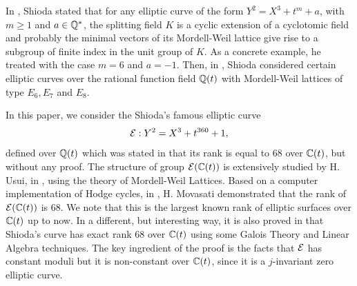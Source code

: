 \documentclass[11pt]{amsart}
\begin{document}

In \cite{Shioda1999a}, Shioda stated that for any elliptic curve of the form 
$Y^2 =X^3 + t^m +a$, with $m\geq 1$ and $a \in {\mathbb Q}^*$,  the splitting field $K$
is a cyclic extension of a cyclotomic field and probably the minimal vectors of its 
Mordell-Weil lattice give rise  to a subgroup of finite index in the unit group of $K$. 
As a concrete example, he treated with the case $m=6$ and $a=-1$.
Then, in \cite{Shioda1999}, Shioda considered certain elliptic curves over the rational function field  ${\mathbb Q}(t)$ with Mordell-Weil lattices of type $E_6, E_7$ and $E_8$.



In this paper, we  consider the  Shioda's famous  elliptic curve
\begin{equation}
	\label{shi-eq1}
	{\mathcal E} : Y^2=X^3 + t^{360} +1,
\end{equation}
defined over ${\mathbb Q}(t)$ which was stated in \cite{Shioda1992a} that its 
rank is equal to $68$ over ${\mathbb C}(t)$, but without any proof. 
The structure of   group ${\mathcal E} ({\mathbb C}(t))$ is extensively studied  
by H. Usui, in  \cites{Usui2008}, using the theory of Mordell-Weil Lattices.
Based on  a computer implementation of
Hodge cycles, in \cite[Sec. 15.13]{movasati2021course}, H. Movasati  demonstrated that  the rank of ${\mathcal E}({\mathbb C}(t))$ is $68$. We note that this is the largest known rank of elliptic surfaces over ${\mathbb C}(t)$ up to now.
In a different, but interesting way,  it is also  proved in \cite{Chahal2000} that Shioda's curve has exact rank $68$ over ${\mathbb C}(t)$  using some Galois Theory and   Linear Algebra techniques.
The key ingredient of the proof is  the facts that  ${\mathcal E}$ has   constant moduli 
but it is non-constant over ${\mathbb C}(t)$, since it is a $j$-invariant  zero  elliptic curve.
\end{document}
